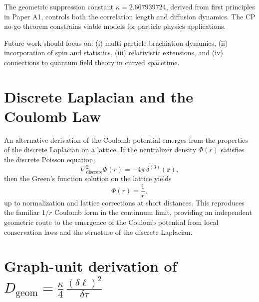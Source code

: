 \documentclass[11pt]{article}
\theoremstyle{plain}
\theoremstyle{definition}
\begin{document}
The geometric suppression constant $\kappa = 2.667939724$, derived from first principles in Paper A1, controls both the correlation length and diffusion dynamics. The CP no-go theorem constrains viable models for particle physics applications.

Future work should focus on: (i) multi-particle brachiation dynamics, (ii) incorporation of spin and statistics, (iii) relativistic extensions, and (iv) connections to quantum field theory in curved spacetime.

\appendix

\section{Discrete Laplacian and the Coulomb Law}
\label{app:discrete-laplacian-coulomb}

An alternative derivation of the Coulomb potential emerges from the properties of the discrete Laplacian on a lattice. If the neutralizer density $\Phi(r)$ satisfies the discrete Poisson equation,
\begin{equation}
  \nabla^2_{\text{discrete}} \Phi(r) = -4\pi\,\delta^{(3)}(\mathbf{r}),
\end{equation}
then the Green's function solution on the lattice yields
\begin{equation}
  \Phi(r) = \frac{1}{r},
\end{equation}
up to normalization and lattice corrections at short distances. This reproduces the familiar $1/r$ Coulomb form in the continuum limit, providing an independent geometric route to the emergence of the Coulomb potential from local conservation laws and the structure of the discrete Laplacian.

\section{Graph-unit derivation of \texorpdfstring{$D_{\mathrm{geom}}=\frac{\kappa}{4}\,\frac{(\delta\ell)^2}{\delta\tau}$}{D\_geom = (κ/4)(δℓ)²/δτ}}\label{app:D-derivation-graph}
\end{document}
